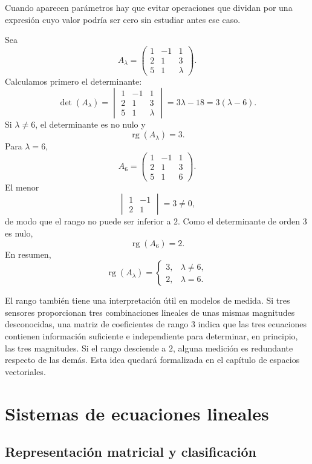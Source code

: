 Cuando aparecen parámetros hay que evitar operaciones que dividan por una expresión cuyo valor podría ser cero sin estudiar antes ese caso.

\begin{example}
Sea
\[
A_\lambda=
\begin{pmatrix}
1&-1&1\\
2&1&3\\
5&1&\lambda
\end{pmatrix}.
\]
Calculamos primero el determinante:
\[
\det(A_\lambda)
=
\begin{vmatrix}
1&-1&1\\
2&1&3\\
5&1&\lambda
\end{vmatrix}
=3\lambda-18=3(\lambda-6).
\]
Si $\lambda\neq6$, el determinante es no nulo y
\[
\operatorname{rg}(A_\lambda)=3.
\]
Para $\lambda=6$,
\[
A_6=
\begin{pmatrix}
1&-1&1\\
2&1&3\\
5&1&6
\end{pmatrix}.
\]
El menor
\[
\begin{vmatrix}1&-1\\2&1\end{vmatrix}=3\neq0,
\]
de modo que el rango no puede ser inferior a $2$. Como el determinante de orden $3$ es nulo,
\[
\boxed{\operatorname{rg}(A_6)=2.}
\]
En resumen,
\[
\operatorname{rg}(A_\lambda)=
\begin{cases}
3,&\lambda\neq6,\\
2,&\lambda=6.
\end{cases}
\]
\end{example}

El rango también tiene una interpretación útil en modelos de medida. Si tres sensores proporcionan tres combinaciones lineales de unas mismas magnitudes desconocidas, una matriz de coeficientes de rango $3$ indica que las tres ecuaciones contienen información suficiente e independiente para determinar, en principio, las tres magnitudes. Si el rango desciende a $2$, alguna medición es redundante respecto de las demás. Esta idea quedará formalizada en el capítulo de espacios vectoriales.

\section{Sistemas de ecuaciones lineales}
\label{sec:sistemas-lineales}

\subsection{Representación matricial y clasificación}

